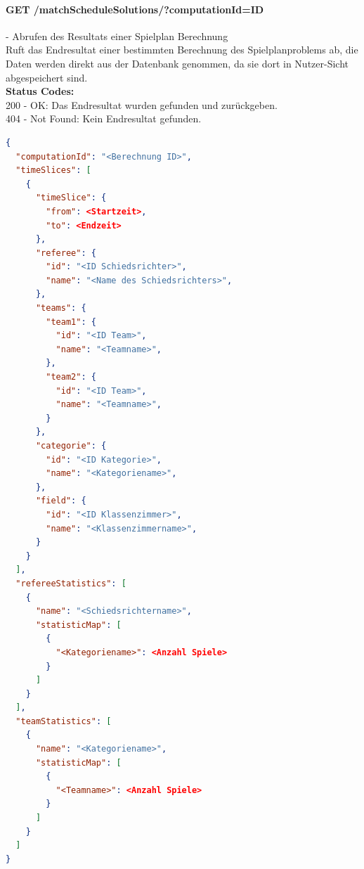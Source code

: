 \paragraph{GET /matchScheduleSolutions/?computationId={ID}} - Abrufen des Resultats einer Spielplan Berechnung\mbox{}\\
Ruft das Endresultat einer bestimmten Berechnung des Spielplanproblems ab, die Daten werden direkt aus der Datenbank genommen, da sie dort in Nutzer-Sicht abgespeichert sind.\\
\textbf{Status Codes:}\\
200 - OK: Das Endresultat wurden gefunden und zurückgeben.\\
404 - Not Found: Kein Endresultat gefunden.\\

\begin{lstlisting}[language=JSON, caption=Beispiel eines Endresultates für das Spielplanproblem, label=lst:solution_matchScheduling]  
{
  "computationId": "<Berechnung ID>",
  "timeSlices": [
    {
      "timeSlice": {
        "from": <Startzeit>,
        "to": <Endzeit>
      },
      "referee": {
        "id": "<ID Schiedsrichter>",
        "name": "<Name des Schiedsrichters>",
      },
      "teams": {
        "team1": {
          "id": "<ID Team>",
          "name": "<Teamname>",
        },
        "team2": {
          "id": "<ID Team>",
          "name": "<Teamname>",
        }
      },
      "categorie": {
        "id": "<ID Kategorie>",
        "name": "<Kategoriename>",
      },
      "field": {
        "id": "<ID Klassenzimmer>",
        "name": "<Klassenzimmername>",
      }
    }
  ],
  "refereeStatistics": [
    {
      "name": "<Schiedsrichtername>",
      "statisticMap": [
        {
          "<Kategoriename>": <Anzahl Spiele>
        }
      ]
    }
  ],
  "teamStatistics": [
    {
      "name": "<Kategoriename>",
      "statisticMap": [
        {
          "<Teamname>": <Anzahl Spiele>
        }
      ]
    }
  ]
}
\end{lstlisting}